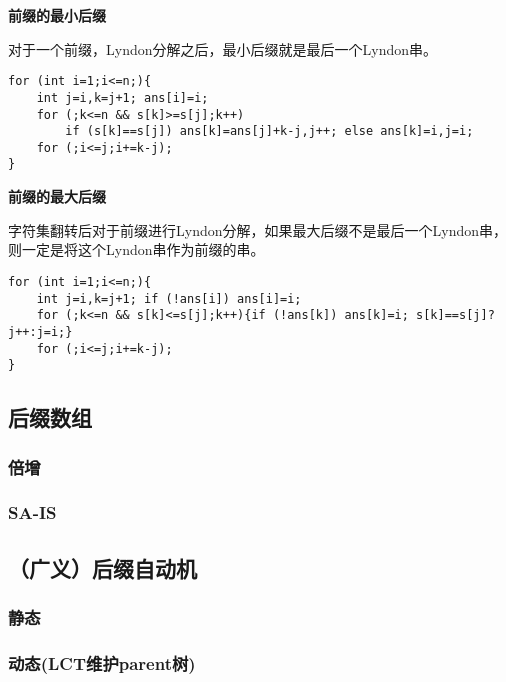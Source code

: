 \textbf{前缀的最小后缀}

对于一个前缀，Lyndon分解之后，最小后缀就是最后一个Lyndon串。

\begin{lstlisting}
for (int i=1;i<=n;){
	int j=i,k=j+1; ans[i]=i;
	for (;k<=n && s[k]>=s[j];k++) 
		if (s[k]==s[j]) ans[k]=ans[j]+k-j,j++; else ans[k]=i,j=i;
	for (;i<=j;i+=k-j);
}
\end{lstlisting}

\textbf{前缀的最大后缀}

字符集翻转后对于前缀进行Lyndon分解，如果最大后缀不是最后一个Lyndon串，则一定是将这个Lyndon串作为前缀的串。

\begin{lstlisting}
for (int i=1;i<=n;){
	int j=i,k=j+1; if (!ans[i]) ans[i]=i;
	for (;k<=n && s[k]<=s[j];k++){if (!ans[k]) ans[k]=i; s[k]==s[j]?j++:j=i;}
	for (;i<=j;i+=k-j);
}
\end{lstlisting}

\newpage

\subsection{后缀数组}

\subsubsection{倍增}



\subsubsection{SA-IS}



\newpage

\subsection{（广义）后缀自动机}

\subsubsection{静态}




\subsubsection{动态(LCT维护parent树)}

